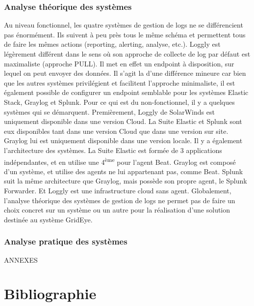 \documentclass[paper=a4, fontsize=11pt]{scrartcl}
\newcommand{\ts}{\textsuperscript} %
\begin{document}
\subsubsection{Analyse théorique des systèmes}
Au niveau fonctionnel, les quatre systèmes de gestion de logs ne se différencient pas énormément. Ils suivent à peu près tous le même schéma et permettent tous de faire les mêmes actions (reporting, alerting, analyse, etc.). Loggly est légèrement différent dans le sens où son approche de collecte de log par défaut est maximaliste (approche PULL). Il met en effet un endpoint à disposition, sur lequel on peut envoyer des données. Il s'agit la d'une différence mineure car bien que les autres systèmes privilégient et facilitent l'approche minimaliste, il est également possible de configurer un endpoint semblable pour les systèmes Elastic Stack, Graylog et Splunk.
Pour ce qui est du non-fonctionnel, il y a quelques systèmes qui se démarquent. Premièrement, Loggly de SolarWinds est uniquement disponible dans une version Cloud. La Suite Elastic et Splunk sont eux disponibles tant dans une version Cloud que dans une version sur site. Graylog lui est uniquement disponible dans une version locale. Il y a également l'architecture des systèmes. La Suite Elastic est formée de 3 applications indépendantes, et en utilise une 4\ts{ème} pour l'agent Beat. Graylog est composé d'un système, et utilise des agents ne lui appartenant pas, comme Beat. Splunk suit la même architecture que Graylog, mais possède son propre agent, le Splunk Forwarder. Et Loggly est une infrastructure cloud sans agent.
Globalement, l'analyse théorique des systèmes de gestion de logs ne permet pas de faire un choix concret sur un système ou un autre pour la réalisation d'une solution destinée au système GridEye.
\subsubsection{Analyse pratique des systèmes}


\newpage

\thispagestyle{empty}
\centering
\vspace{10cm}
{\huge ANNEXES}

\newpage

\appendix
\justify

\listoftables
\newpage

\listoffigures
\newpage

\section{Bibliographie}
\end{document}

